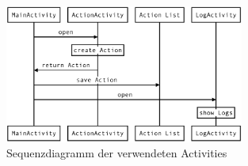 \begin{figure}[ht]
    \centering
    \includegraphics[width=0.7\textwidth]{images/activities.png}
    \caption{Sequenzdiagramm der verwendeten Activities}
    \label{fig:activities}
\end{figure}


